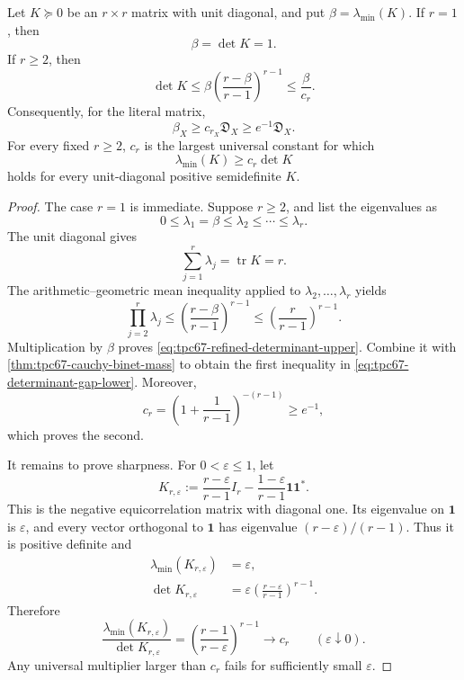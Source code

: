 \begin{theorem}
\label{thm:tpc67-sharp-determinant-gap}
Let \(K\succeq0\) be an \(r\times r\) matrix with unit diagonal, and put
\(\beta=\lambda_{\min}(K)\).  If \(r=1\), then
\[
 \beta=\det K=1.
\]
If \(r\ge2\), then
\begin{equation}
 \det K
 \le
 \beta
 \left(\frac{r-\beta}{r-1}\right)^{r-1}
 \le
 \frac{\beta}{c_r}.
 \label{eq:tpc67-refined-determinant-upper}
\end{equation}
Consequently, for the literal matrix,
\begin{equation}
 \boxed{\qquad
 \beta_X
 \ge
 c_{r_X}\mathfrak D_X
 \ge
 e^{-1}\mathfrak D_X.
 \qquad}
 \label{eq:tpc67-determinant-gap-lower}
\end{equation}
For every fixed \(r\ge2\), \(c_r\) is the largest universal constant
for which
\[
 \lambda_{\min}(K)\ge c_r\det K
\]
holds for every unit-diagonal positive semidefinite \(K\).
\end{theorem}

\begin{proof}
The case \(r=1\) is immediate.  Suppose \(r\ge2\), and list the
eigenvalues as
\[
 0\le\lambda_1=\beta\le\lambda_2\le\cdots\le\lambda_r.
\]
The unit diagonal gives
\[
 \sum_{j=1}^r\lambda_j=\operatorname{tr}K=r.
\]
The arithmetic--geometric mean inequality applied to
\(\lambda_2,\ldots,\lambda_r\) yields
\[
 \prod_{j=2}^r\lambda_j
 \le
 \left(\frac{r-\beta}{r-1}\right)^{r-1}
 \le
 \left(\frac r{r-1}\right)^{r-1}.
\]
Multiplication by \(\beta\) proves
\eqref{eq:tpc67-refined-determinant-upper}.  Combine it with
\cref{thm:tpc67-cauchy-binet-mass} to obtain the first inequality in
\eqref{eq:tpc67-determinant-gap-lower}.  Moreover,
\[
 c_r
 =
 \left(1+\frac1{r-1}\right)^{-(r-1)}
 \ge e^{-1},
\]
which proves the second.

It remains to prove sharpness.  For \(0<\varepsilon\le1\), let
\begin{equation}
 K_{r,\varepsilon}
 :=
 \frac{r-\varepsilon}{r-1}I_r
 -
 \frac{1-\varepsilon}{r-1}\mathbf1\mathbf1^*.
 \label{eq:tpc67-negative-equicorrelation}
\end{equation}
This is the negative equicorrelation matrix with diagonal one.  Its
eigenvalue on \(\mathbf1\) is \(\varepsilon\), and every vector
orthogonal to \(\mathbf1\) has eigenvalue
\((r-\varepsilon)/(r-1)\).  Thus it is positive definite and
\begin{align*}
 \lambda_{\min}(K_{r,\varepsilon})
 &=\varepsilon,\\
 \det K_{r,\varepsilon}
 &=
 \varepsilon
 \left(\frac{r-\varepsilon}{r-1}\right)^{r-1}.
\end{align*}
Therefore
\[
 \frac{\lambda_{\min}(K_{r,\varepsilon})}
      {\det K_{r,\varepsilon}}
 =
 \left(\frac{r-1}{r-\varepsilon}\right)^{r-1}
 \longrightarrow c_r
 \qquad(\varepsilon\downarrow0).
\]
Any universal multiplier larger than \(c_r\) fails for sufficiently
small \(\varepsilon\).
\end{proof}


